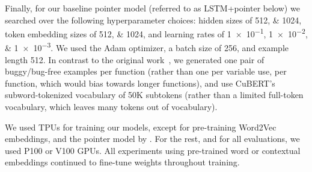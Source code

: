 \documentclass{article}
\newcommand{\BERTforCode}{CuBERT\xspace}
\newcommand{\update}[1]{#1}
\begin{document}
Finally, for our baseline pointer model (referred to as LSTM+pointer below) we searched over the following hyperparameter choices: hidden sizes of \numlist{512;1024}, token embedding sizes of \numlist{512;1024}, and learning rates of \numlist{1e-1;1e-2;1e-3}. We used the Adam optimizer, a batch size of \num{256}, and example length \num{512}. In contrast to the original work~\citep{DBLP:journals/corr/abs-1904-01720}, we generated one pair of buggy/bug-free examples per function (rather than one per variable use, per function, which would bias towards longer functions), and use \BERTforCode's subword-tokenized vocabulary of 50K subtokens (rather than a limited full-token vocabulary, which leaves many tokens out of vocabulary).

\update{We used TPUs for training our models, except for pre-training Word2Vec embeddings, and the pointer model by \citet{DBLP:journals/corr/abs-1904-01720}. For the rest, and for all evaluations, we used P100 or V100 GPUs. All experiments using pre-trained word or contextual embeddings continued to fine-tune weights throughout training.}
\end{document}
